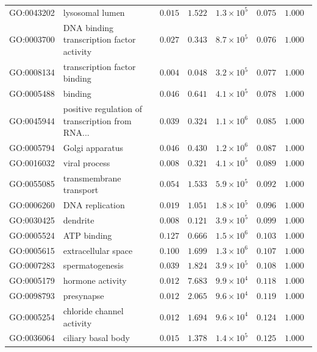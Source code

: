 \documentclass{article}
\begin{document}
\begin{center}
\begin{longtable*}{|l|l|r|r|r|r|r|}
            GO:0043202 & lysosomal lumen & $ 0.015$ & $ 1.522$ & $1.3\times 10^{5}$ & $ 0.075$ & $ 1.000~~$ \\
            GO:0003700 & DNA binding transcription factor activity & $ 0.027$ & $ 0.343$ & $8.7\times 10^{5}$ & $ 0.076$ & $ 1.000~~$ \\
            GO:0008134 & transcription factor binding & $ 0.004$ & $ 0.048$ & $3.2\times 10^{5}$ & $ 0.077$ & $ 1.000~~$ \\
            GO:0005488 & binding & $ 0.046$ & $ 0.641$ & $4.1\times 10^{5}$ & $ 0.078$ & $ 1.000~~$ \\
            GO:0045944 & positive regulation of transcription from RNA... & $ 0.039$ & $ 0.324$ & $1.1\times 10^{6}$ & $ 0.085$ & $ 1.000~~$ \\
            GO:0005794 & Golgi apparatus & $ 0.046$ & $ 0.430$ & $1.2\times 10^{6}$ & $ 0.087$ & $ 1.000~~$ \\
            GO:0016032 & viral process & $ 0.008$ & $ 0.321$ & $4.1\times 10^{5}$ & $ 0.089$ & $ 1.000~~$ \\
            GO:0055085 & transmembrane transport & $ 0.054$ & $ 1.533$ & $5.9\times 10^{5}$ & $ 0.092$ & $ 1.000~~$ \\
            GO:0006260 & DNA replication & $ 0.019$ & $ 1.051$ & $1.8\times 10^{5}$ & $ 0.096$ & $ 1.000~~$ \\
            GO:0030425 & dendrite & $ 0.008$ & $ 0.121$ & $3.9\times 10^{5}$ & $ 0.099$ & $ 1.000~~$ \\
            GO:0005524 & ATP binding & $ 0.127$ & $ 0.666$ & $1.5\times 10^{6}$ & $ 0.103$ & $ 1.000~~$ \\
            GO:0005615 & extracellular space & $ 0.100$ & $ 1.699$ & $1.3\times 10^{6}$ & $ 0.107$ & $ 1.000~~$ \\
            GO:0007283 & spermatogenesis & $ 0.039$ & $ 1.824$ & $3.9\times 10^{5}$ & $ 0.108$ & $ 1.000~~$ \\
            GO:0005179 & hormone activity & $ 0.012$ & $ 7.683$ & $9.9\times 10^{4}$ & $ 0.118$ & $ 1.000~~$ \\
            GO:0098793 & presynapse & $ 0.012$ & $ 2.065$ & $9.6\times 10^{4}$ & $ 0.119$ & $ 1.000~~$ \\
            GO:0005254 & chloride channel activity & $ 0.012$ & $ 1.694$ & $9.6\times 10^{4}$ & $ 0.124$ & $ 1.000~~$ \\
            GO:0036064 & ciliary basal body & $ 0.015$ & $ 1.378$ & $1.4\times 10^{5}$ & $ 0.125$ & $ 1.000~~$ \\

\end{longtable*}
\end{center}
\end{document}
